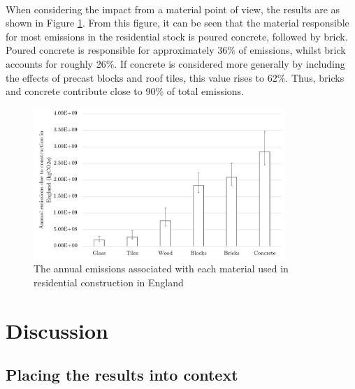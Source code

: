 \documentclass[12pt]{article}
\begin{document}
\paragraph{}
When considering the impact from a material point of view, the results are as shown in Figure \ref{fig:emissionsbymaterial}. From this figure, it can be seen that the material responsible for most emissions in the residential stock is poured concrete, followed by brick. Poured concrete is responsible for approximately 36\% of emissions, whilst brick accounts for roughly 26\%. If concrete is considered more generally by including the effects of precast blocks and roof tiles, this value rises to 62\%. Thus, bricks and concrete contribute close to 90\% of total emissions.

\begin{figure}[ht!]
    \centering
    \includegraphics[width=0.85\textwidth]{Figures/Materials_eng.png}
    \caption{The annual emissions associated with each material used in residential construction in England}
    \label{fig:emissionsbymaterial}
\end{figure}


\section{Discussion}
\label{discussion}

\subsection{Placing the results into context}
\label{widercontext}
\end{document}
